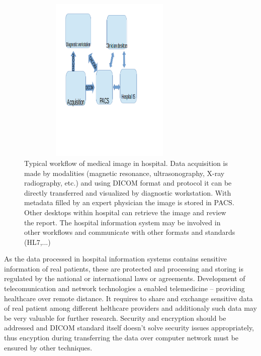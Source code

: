 \begin{figure}[ht]
    \centering
    \includegraphics[width=0.8\textwidth, height=8cm]{chapter4/pacs.png}
    \caption{Typical workflow of medical image in hospital. Data acquisition is made by modalities (magnetic resonance, ultrasonography, X-ray radiography, etc.) and using DICOM format and protocol it can be directly transferred and visualized by diagnostic workstation. With metadata filled by an expert physician the image is stored in PACS. Other desktops within hospital can retrieve the image and review the report. The hospital information system may be involved in other workflows and communicate with other formats and standards (HL7,...)
    }
    \label{fig:pacs}
\end{figure}

As the data processed in hospital information systems contains sensitive information of real patients, these are protected and processing and storing is regulated by the national or international laws or agreements.
Development of telecomunication and network technologies a enabled telemedicine -- providing healthcare over remote distance. It requires to share and exchange  sensitive data of real patient among different helthcare providers and additionaly such data may be very valuable for further research. Security and encryption should be addressed and DICOM standard itself doesn't solve security issues appropriately, thus encyption during transferring the data over computer network must be ensured by other techniques.

